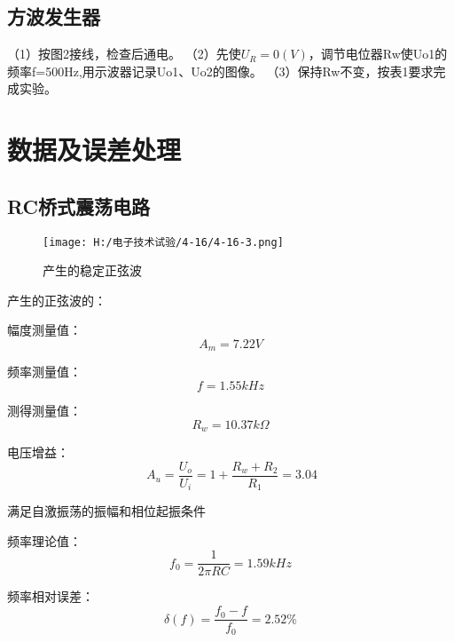 \documentclass{article}
\begin{document}
 \subsection{方波发生器}
 （1）按图2接线，检查后通电。
 （2）先使$U_R=0(V)$，调节电位器Rw使Uo1的频率f=500Hz,用示波器记录Uo1、Uo2的图像。
 （3）保持Rw不变，按表1要求完成实验。

 
\newpage


\section{ 数据及误差处理}
\subsection{RC桥式震荡电路}

\begin{figure}[h]
    \centering
    \texttt{[image: H:/电子技术试验/4-16/4-16-3.png]}
    \caption{产生的稳定正弦波} \label{fig:aa}
\end{figure}
产生的正弦波的：\par
幅度测量值：\[A_m=7.22V\]\par
频率测量值：\[f=1.55kHz\]\par
测得测量值：\[R_w=10.37k\Omega\]\par
电压增益：
\begin{equation*}
    \ A_u=\frac{U_o}{U_i}=1+\frac{R_w+R_2}{R_1}=3.04
\end{equation*}\par
满足自激振荡的振幅和相位起振条件\par
频率理论值：\[f_0=\frac{1}{2\pi RC}=1.59kHz\] \par
频率相对误差：\[\delta (f)=\frac{f_0-f}{f_0}=2.52\%\]\par
\newpage
\end{document}
